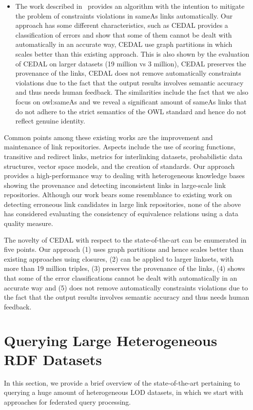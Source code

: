 \begin{itemize}
	\item The work described in~\cite{Melo2013NotQT} provides an algorithm with the intention to mitigate the problem of constraints violations in sameAs links automatically. Our approach has some different characteristics, such as CEDAL provides a classification of errors and show that some of them cannot be dealt with automatically in an accurate way, CEDAL use graph partitions in which scales better than this existing approach. This is also shown by the evaluation of CEDAL on larger datasets (19 million vs 3 million), CEDAL preserves the provenance of the links,  CEDAL does not remove automatically constraints violations due to the fact that the output results involves semantic accuracy and thus needs human feedback. The similarities include the fact that we also focus on owl:sameAs and we reveal a significant amount of sameAs links that do not adhere to the strict semantics of the OWL standard and hence do not reflect genuine identity.
\end{itemize}
%
Common points among these existing works are the improvement and maintenance of link repositories. Aspects include the use of scoring functions, transitive and redirect links, metrics for interlinking datasets, probabilistic data structures, vector space models, and the creation of standards. Our approach provides a high-performance way to dealing with heterogeneous knowledge bases showing the provenance and detecting inconsistent links in large-scale link repositories. 
Although our work bears some resemblance to existing work on detecting erroneous link candidates in large link repositories, none of the above has considered evaluating the consistency of equivalence relations using a data quality measure. %

The novelty of CEDAL with respect to the state-of-the-art can be enumerated in five points. Our approach (1) uses graph partitions and hence scales better than existing approaches using closures, (2) can be applied to larger linksets, with more than 19 million triples, (3) preserves the provenance of the links, (4) shows that some of the error classifications cannot be dealt with automatically in an accurate way and (5) does not remove automatically constraints violations due to the fact that the output results involves semantic accuracy and thus needs human feedback.

\section{Querying Large Heterogeneous RDF Datasets}
In this section, we provide a brief overview of the state-of-the-art pertaining to querying a huge amount of heterogeneous LOD datasets, in which we start with approaches for federated query processing.
